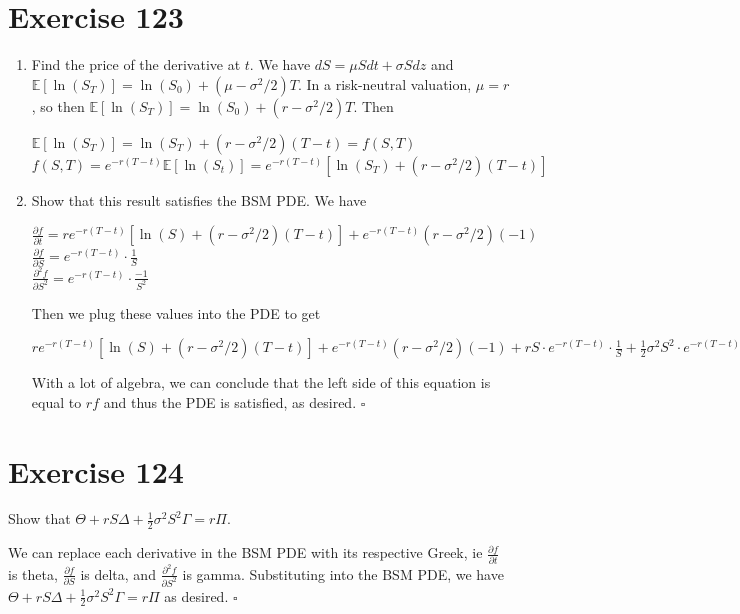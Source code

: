 \documentclass{article}
\begin{document}
\section*{Exercise 123}
\begin{enumerate}
    \item Find the price of the derivative at $t$. We have $dS = \mu S dt + \sigma S dz$ and $\mathbb{E}[\ln(S_T)] = \ln(S_0) + (\mu - \sigma^2/2)T$.
        In a risk-neutral valuation, $\mu = r$, so then $\mathbb{E}[\ln(S_T)] = \ln(S_0) + (r - \sigma^2/2)T$. Then
        \begin{center}
            $\mathbb{E}[\ln(S_T)] = \ln(S_T) + (r - \sigma^2/2)(T-t) = f(S, T)$ \\
            $f(S,T) = e^{-r(T-t)}\mathbb{E}[\ln(S_t)] = e^{-r(T-t)}[\ln(S_T) + (r - \sigma^2/2)(T-t)]$
        \end{center}
    \item Show that this result satisfies the BSM PDE. We have
        \begin{center}
            $\frac{\partial f}{\partial t} = re^{-r(T-t)}[\ln(S)+(r - \sigma^2/2)(T-t)] + e^{-r(T-t)}(r-\sigma^2/2)(-1)$ \\
            $\frac{\partial f}{\partial S} = e^{-r(T-t)} \cdot \frac{1}{S}$ \\
            $\frac{\partial^2f}{\partial S^2} = e^{-r(T-t)} \cdot \frac{-1}{S^2}$
        \end{center}
        Then we plug these values into the PDE to get
        \begin{center}
            $re^{-r(T-t)}[\ln(S)+(r - \sigma^2/2)(T-t)] + e^{-r(T-t)}(r-\sigma^2/2)(-1) + rS \cdot e^{-r(T-t)} \cdot \frac{1}{S} + \frac{1}{2}\sigma^2S^2 \cdot e^{-r(T-t)} \cdot \frac{-1}{S^2} = rf$
        \end{center}
        With a lot of algebra, we can conclude that the left side of this equation is equal to $rf$ and thus the PDE is satisfied, as desired. $\square$
\end{enumerate}

\section*{Exercise 124}
Show that $\Theta+rS\Delta+\frac{1}{2}\sigma^2S^2\Gamma=r\Pi$.
\begin{flushleft}
    We can replace each derivative in the BSM PDE with its respective Greek, ie $\frac{\partial f}{\partial t}$ is theta, $\frac{\partial f}{\partial S}$ is delta, and $\frac{\partial^2f}{\partial S^2}$ is gamma.
    Substituting into the BSM PDE, we have $\Theta+rS\Delta+\frac{1}{2}\sigma^2S^2\Gamma=r\Pi$ as desired. $\square$
\end{flushleft}
\end{document}
